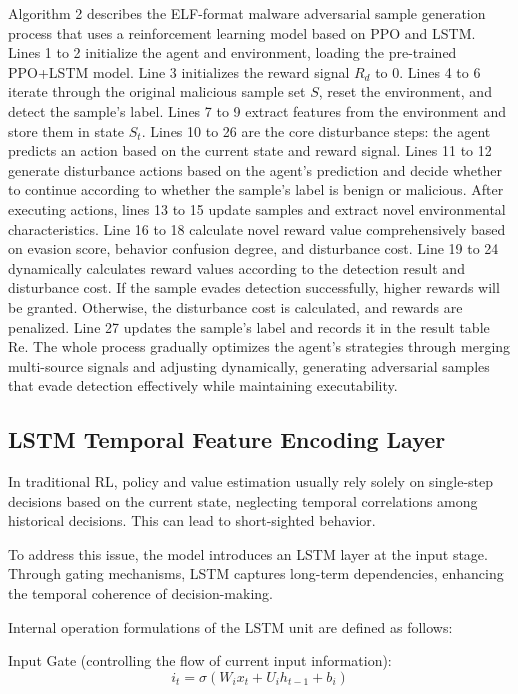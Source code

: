Algorithm 2 describes the ELF-format malware adversarial sample generation process that uses a reinforcement learning model based on PPO and LSTM. Lines 1 to 2 initialize the agent and environment, loading the pre-trained PPO+LSTM model. Line 3 initializes the reward signal $R_d$ to 0. Lines 4 to 6 iterate through the original malicious sample set $S$, reset the environment, and detect the sample's label. Lines 7 to 9 extract features from the environment and store them in state $S_t$. Lines 10 to 26 are the core disturbance steps: the agent predicts an action based on the current state and reward signal. Lines 11 to 12 generate disturbance actions based on the agent's prediction and decide whether to continue according to whether the sample's label is benign or malicious. After executing actions, lines 13 to 15 update samples and extract novel environmental characteristics. Line 16 to 18 calculate novel reward value comprehensively based on evasion score, behavior confusion degree, and disturbance cost. Line 19 to 24 dynamically calculates reward values according to the detection result and disturbance cost. If the sample evades detection successfully, higher rewards will be granted. Otherwise, the disturbance cost is calculated, and rewards are penalized. Line 27 updates the sample's label and records it in the result table Re. The whole process gradually optimizes the agent's strategies through merging multi-source signals and adjusting dynamically, generating adversarial samples that evade detection effectively while maintaining executability.

\subsection{LSTM Temporal Feature Encoding Layer}

In traditional RL, policy and value estimation usually rely solely on single-step decisions based on the current state, neglecting temporal correlations among historical decisions. This can lead to short-sighted behavior.

To address this issue, the model introduces an LSTM layer at the input stage. Through gating mechanisms, LSTM captures long-term dependencies, enhancing the temporal coherence of decision-making.

Internal operation formulations of the LSTM unit are defined as follows:

Input Gate (controlling the flow of current input information):
\begin{equation}
i_t = \sigma(W_i x_t + U_i h_{t-1} + b_i)
\end{equation}

